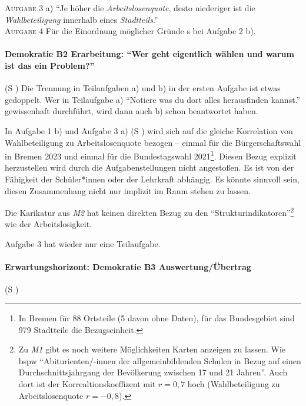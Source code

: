 \textsc{Aufgabe 3} a) \quad
\enquote{Je höher die \emph{Arbeitslosenquote}, desto niederiger ist die \emph{Wahlbeteiligung} innerhalb eines \emph{Stadtteils}.}
\\

\textsc{Aufgabe 4} \quad
Für die Einordnung möglicher Gründe \gls{s} bei Aufgabe 2 b).



\paragraph{Demokratie B2 Erarbeitung: \enquote{Wer geht eigentlich wählen und warum ist das ein Problem?}}  (\gls{S} \pageref{DEMOKRATIE-B2})
Die Trennung in Teilaufgaben a) und b) in der ersten Aufgabe ist etwas gedoppelt. Wer in Teilaufgabe a) \enquote{Notiere was du dort alles herausfinden kannst.} gewissenhaft durchführt, wird dann auch b) schon beantwortet haben.

In Aufgabe 1 b) und Aufgabe 3 a) (\gls{S} \pageref{DEMOKRATIE-B3}) wird sich auf die gleiche Korrelation von Wahlbeteiligung zu Arbeitslosenquote bezogen
-- einmal für die Bürgerschaftswahl in Bremen 2023 und einmal für die Bundestagswahl 2021\footnote{
    In Bremen für 88 Ortsteile (5 davon ohne Daten), für das Bundesgebiet sind 979 Stadtteile die Bezugseinheit.}. 
Diesen Bezug explizit herzustellen wird durch die Aufgabenstellungen nicht angestoßen. Es ist von der Fähigkeit der Schüler*innen oder der Lehrkraft abhängig. Es könnte sinnvoll sein, diesen Zusammenhang nicht nur implizit im Raum stehen zu lassen.

Die Karikatur aus \emph{M2} hat keinen direkten Bezug zu den \enquote{Strukturindikatoren}\footnote{
    Zu \emph{M1} gibt es noch weitere Möglichkeiten Karten anzeigen zu lassen. Wie \gls{bspw} \enquote{Abiturienten/-innen der allgemeinbildenden Schulen in Bezug auf einen Durchschnittsjahrgang der Bevölkerung zwischen 17 und 21 Jahren}. Auch dort ist der Korrealtionskoeffizent mit $r = 0,7$ hoch (Wahlbeteiligung zu Arbeitslosenquote $r = -0,8$).
} wie der Arbeitslosigkeit. 

Aufgabe 3 hat wieder nur eine Teilaufgabe. 



\paragraph{Erwartungshorizont: Demokratie B3 Auswertung/Übertrag}  (\gls{S} \pageref{DEMOKRATIE-B3})

